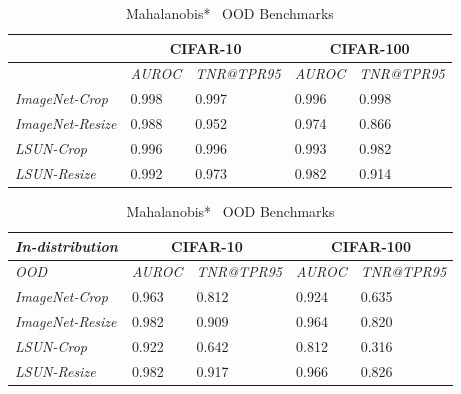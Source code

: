 \documentclass[accepted]{uai2022} %
\begin{document}
\begin{table}[t]
    \setlength\tabcolsep{4pt}
    \centering
    \caption{Mahalanobis~\citep{Lee:NIPS:2018:simple} OOD Benchmarks}
        \label{Tab:ood_mahalanobis}
         
        \begin{tabular}{@{}lllll@{}}
            \toprule
                                      & \multicolumn{2}{c}{CIFAR-10}      & \multicolumn{2}{c}{CIFAR-100}     \\ \midrule
                                      & \textit{AUROC} & \textit{TNR@TPR95} & \textit{AUROC} & \textit{TNR@TPR95} \\\midrule
            \textit{ImageNet-Crop}    & 0.998          &  0.997           & 0.996          & 0.998            \\
            \textit{ImageNet-Resize}  & 0.988          &  0.952           & 0.974          & 0.866            \\
            \textit{LSUN-Crop}        & 0.996          &  0.996           & 0.993          & 0.982            \\
            \textit{LSUN-Resize}      & 0.992          &  0.973           & 0.982          & 0.914            \\ \bottomrule
        \end{tabular}

        
        \caption{Mahalanobis*~\citep{Hsu:CVPR:2020:generalized} OOD Benchmarks}
        \label{Tab:ood_mahalanobis_star}
        
        \begin{tabular}{@{}lllll@{}}
            \toprule
            \textit{In-distribution} & \multicolumn{2}{c}{CIFAR-10}      & \multicolumn{2}{c}{CIFAR-100}     \\ \midrule
            \textit{OOD}              & \textit{AUROC} & \textit{TNR@TPR95} & \textit{AUROC} & \textit{TNR@TPR95} \\\midrule
            \textit{ImageNet-Crop}    & 0.963          & 0.812            &   0.924        & 0.635            \\
            \textit{ImageNet-Resize}  & 0.982          & 0.909            &   0.964        & 0.820            \\
            \textit{LSUN-Crop}        & 0.922          & 0.642            &   0.812        & 0.316            \\
            \textit{LSUN-Resize}      & 0.982          & 0.917            &   0.966        & 0.826            \\ \bottomrule
        \end{tabular}
    \end{table}
\end{document}
